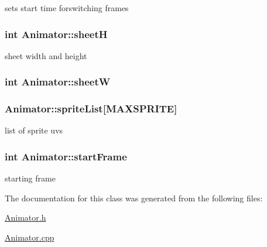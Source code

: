 sets start time forswitching frames 

\hypertarget{class_animator_ac8c6dac49066e30e4d90af78b8c61a09}{}
\subsubsection[{sheet\+H}]{\setlength{\rightskip}{0pt plus 5cm}int Animator\+::sheet\+H}\label{class_animator_ac8c6dac49066e30e4d90af78b8c61a09}


sheet width and height 

\hypertarget{class_animator_a8953adfaac5c56c94a273928189a097c}{}
\subsubsection[{sheet\+W}]{\setlength{\rightskip}{0pt plus 5cm}int Animator\+::sheet\+W}\label{class_animator_a8953adfaac5c56c94a273928189a097c}
\hypertarget{class_animator_a489c91d2c63336faf1fac7c0ad866126}{}
\subsubsection[{sprite\+List}]{ Animator\+::sprite\+List\mbox{[}{\bf M\+A\+X\+S\+P\+R\+I\+T\+E}\mbox{]}}\label{class_animator_a489c91d2c63336faf1fac7c0ad866126}


list of sprite uvs 

\hypertarget{class_animator_ab904a1e936e9c123c4f36077d41c515c}{}
\subsubsection[{start\+Frame}]{\setlength{\rightskip}{0pt plus 5cm}int Animator\+::start\+Frame}\label{class_animator_ab904a1e936e9c123c4f36077d41c515c}


starting frame 



The documentation for this class was generated from the following files\+:\begin{DoxyCompactItemize}
\item 
\hyperlink{_animator_8h}{Animator.\+h}\item 
\hyperlink{_animator_8cpp}{Animator.\+cpp}\end{DoxyCompactItemize}

